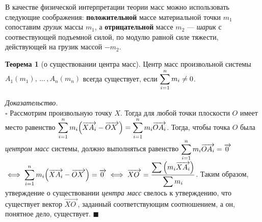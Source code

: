 \documentclass[14pt]{extarticle}
\let\vecarrow\overrightarrow
\theoremstyle{definition}
\theoremstyle{theorem}
\newtheorem*{theorem}{Теорема}
\renewenvironment{proof}
    {\noindent \textit{Доказательство.}\\
	\indent $\square$}
	{ $\blacksquare$\\ }
\begin{document}


В качестве физической интерпретации теории масс можно использовать
следующие соображения: \textbf{положительной} массе материальной точки \(m_1\)
сопоставим \textit{грузик} массы \(m_1\), а \textbf{отрицательной} массе 
\(m_2\) --- \textit{шарик} с соотвествующей подъемной силой,
по модулю равной силе тяжести, действующей на грузик массой \(-m_2\).\\



\begin{theorem}[о существовании центра масс]
	Центр масс произвольной системы $A_1(m_1), \, ... \, ,A_n(m_n)$
	всегда существует, если $\mathlarger{\sum_{i=1}^{n} m_i \ne 0}$.
\end{theorem}

{
\begin{proof}
    Рассмотрим произвольную точку $X$. Тогда для любой  точки
	плоскости $O$ имеет место равенство $\mathlarger{\sum_{i=1}^{n}
	m_i  \Big(\vecarrow{XA_i} - \vecarrow{OX_{\, \,}}\Big) = \sum_{i=1}^{n} 
	m_i  \vecarrow{OA_i}}$. Тогда, чтобы точка $O$ была 
	\textit{центром масс} системы, должно выполняться равенство
	$\mathlarger{\sum_{i=1}^{n} 
	m_i  \vecarrow{OA_i}} = \vecarrow{0_{\,}}$ $\iff \mathlarger{\sum_{i=1}^{n} m_i 
	\Big(\vecarrow{XA_i} - \vecarrow{OX_{\, \,}}\Big) = \vecarrow{0_{\,}} \iff 
    \vecarrow{XO_{\;}} = \frac{\displaystyle \sum \Big(m_i
	\vecarrow{XA_i} \Big)}{\displaystyle\sum m_i}}$. Таким образом, %
    утверждение о существовании \textit{центра масс} свелось к утверждению, что существует
	вектор $\vecarrow{XO_{\;}}$, заданный соответствующим соотношением, а он,
	понятное дело, существует.
\end{proof}
\par}
\end{document}
